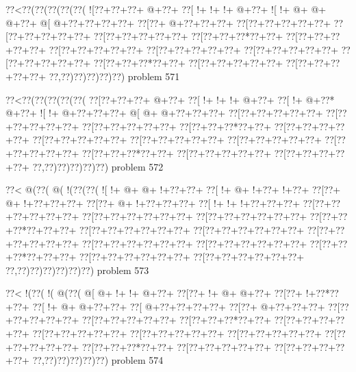 \vbox{\vbox{\goo
\0??<\0??(\0??(\0??(\0??(\0??(
\- ![\0??+\0??+\0??+\- @+\0??+
\0??[\- !+\- !+\- !+\- @+\0??+
\- ![\- !+\- @+\- @+\- @+\0??+
\- @[\- @+\0??+\0??+\0??+\0??+
\0??[\0??+\- @+\0??+\0??+\0??+
\0??[\0??+\0??+\0??+\0??+\0??+
\0??[\0??+\0??+\0??+\0??+\0??+
\0??[\0??+\0??+\0??+\0??+\0??+
\0??[\0??+\0??+\0??*\0??+\0??+
\0??[\0??+\0??+\0??+\0??+\0??+
\0??[\0??+\0??+\0??+\0??+\0??+
\0??[\0??+\0??+\0??+\0??+\0??+
\0??[\0??+\0??+\0??+\0??+\0??+
\0??[\0??+\0??+\0??+\0??+\0??+
\0??[\0??+\0??+\0??*\0??+\0??+
\0??[\0??+\0??+\0??+\0??+\0??+
\0??[\0??+\0??+\0??+\0??+\0??+
\0??,\0??)\0??)\0??)\0??)\0??)
}
\hfil problem 571\hfil\break
}

\vbox{\vbox{\goo
\0??<\0??(\0??(\0??(\0??(\0??(
\0??[\0??+\0??+\0??+\- @+\0??+
\0??[\- !+\- !+\- !+\- @+\0??+
\0??[\- !+\- @+\0??*\- @+\0??+
\- ![\- !+\- @+\0??+\0??+\0??+
\- @[\- @+\- @+\0??+\0??+\0??+
\0??[\0??+\0??+\0??+\0??+\0??+
\0??[\0??+\0??+\0??+\0??+\0??+
\0??[\0??+\0??+\0??+\0??+\0??+
\0??[\0??+\0??+\0??*\0??+\0??+
\0??[\0??+\0??+\0??+\0??+\0??+
\0??[\0??+\0??+\0??+\0??+\0??+
\0??[\0??+\0??+\0??+\0??+\0??+
\0??[\0??+\0??+\0??+\0??+\0??+
\0??[\0??+\0??+\0??+\0??+\0??+
\0??[\0??+\0??+\0??*\0??+\0??+
\0??[\0??+\0??+\0??+\0??+\0??+
\0??[\0??+\0??+\0??+\0??+\0??+
\0??,\0??)\0??)\0??)\0??)\0??)
}
\hfil problem 572\hfil\break
}

\vbox{\vbox{\goo
\0??<\- @(\0??(\- @(\- !(\0??(\0??(
\- ![\- !+\- @+\- @+\- !+\0??+\0??+
\0??[\- !+\- @+\- !+\0??+\- !+\0??+
\0??[\0??+\- @+\- !+\0??+\0??+\0??+
\0??[\0??+\- @+\- !+\0??+\0??+\0??+
\0??[\- !+\- !+\- !+\0??+\0??+\0??+
\0??[\0??+\0??+\0??+\0??+\0??+\0??+
\0??[\0??+\0??+\0??+\0??+\0??+\0??+
\0??[\0??+\0??+\0??+\0??+\0??+\0??+
\0??[\0??+\0??+\0??*\0??+\0??+\0??+
\0??[\0??+\0??+\0??+\0??+\0??+\0??+
\0??[\0??+\0??+\0??+\0??+\0??+\0??+
\0??[\0??+\0??+\0??+\0??+\0??+\0??+
\0??[\0??+\0??+\0??+\0??+\0??+\0??+
\0??[\0??+\0??+\0??+\0??+\0??+\0??+
\0??[\0??+\0??+\0??*\0??+\0??+\0??+
\0??[\0??+\0??+\0??+\0??+\0??+\0??+
\0??[\0??+\0??+\0??+\0??+\0??+\0??+
\0??,\0??)\0??)\0??)\0??)\0??)\0??)
}
\hfil problem 573\hfil\break
}

\vbox{\vbox{\goo
\0??<\- !(\0??(\- !(\- @(\0??(
\- @[\- @+\- !+\- !+\- @+\0??+
\0??[\0??+\- !+\- @+\- @+\0??+
\0??[\0??+\- !+\0??*\0??+\0??+
\0??[\- !+\- @+\- @+\0??+\0??+
\0??[\- @+\0??+\0??+\0??+\0??+
\0??[\0??+\- @+\0??+\0??+\0??+
\0??[\0??+\0??+\0??+\0??+\0??+
\0??[\0??+\0??+\0??+\0??+\0??+
\0??[\0??+\0??+\0??*\0??+\0??+
\0??[\0??+\0??+\0??+\0??+\0??+
\0??[\0??+\0??+\0??+\0??+\0??+
\0??[\0??+\0??+\0??+\0??+\0??+
\0??[\0??+\0??+\0??+\0??+\0??+
\0??[\0??+\0??+\0??+\0??+\0??+
\0??[\0??+\0??+\0??*\0??+\0??+
\0??[\0??+\0??+\0??+\0??+\0??+
\0??[\0??+\0??+\0??+\0??+\0??+
\0??,\0??)\0??)\0??)\0??)\0??)
}
\hfil problem 574\hfil\break
}


